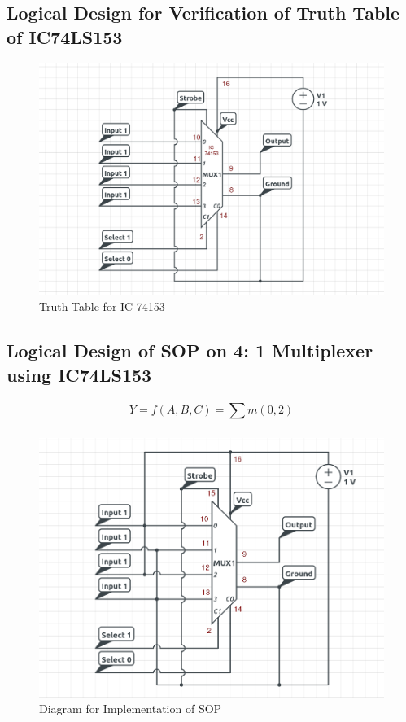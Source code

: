 \documentclass[11pt]{article}
\begin{document}
\subsection{Logical Design for Verification of Truth Table of IC74LS153}
\begin{figure}[H]
	\centering
	\includegraphics[scale = 0.55]{Truth Table.png}
	\caption{Truth Table for IC 74153}
\end{figure}
\subsection{Logical Design of SOP on 4: 1 Multiplexer using IC74LS153}
$$
	Y = f(A, B, C) = \displaystyle\sum_{}^{} m(0, 2)
$$

\begin{figure}[H]
	\centering
	\includegraphics[scale = 0.45]{sop.png}
	\caption{Diagram for Implementation of SOP}
\end{figure}
\end{document}
